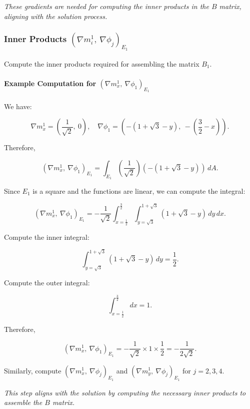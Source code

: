 \documentclass[class=article, crop=false]{standalone}
\begin{document}
\noindent
\textit{These gradients are needed for computing the inner products in the $B$ matrix, aligning with the solution process.}

\subsubsection{Inner Products $\left( \nabla m_i^1,\ \nabla \phi_j \right)_{E_1}$}

Compute the inner products required for assembling the matrix $B_1$.

\paragraph{Example Computation for $\left( \nabla m_x^1,\ \nabla \phi_1 \right)_{E_1}$}

We have:

\[
\nabla m_x^1 = \left( \dfrac{1}{\sqrt{2}},\ 0 \right), \quad \nabla \phi_1 = \left( - (1 + \sqrt{3} - y),\ - \left( \dfrac{3}{2} - x \right) \right).
\]

Therefore,

\[
\left( \nabla m_x^1,\ \nabla \phi_1 \right)_{E_1} = \int_{E_1} \left( \dfrac{1}{\sqrt{2}} \right) \left( - (1 + \sqrt{3} - y) \right) \, dA.
\]

Since $E_1$ is a square and the functions are linear, we can compute the integral:

\[
\left( \nabla m_x^1,\ \nabla \phi_1 \right)_{E_1} = - \dfrac{1}{\sqrt{2}} \int_{x = \tfrac{1}{2}}^{\tfrac{3}{2}} \int_{y = \sqrt{3}}^{1 + \sqrt{3}} (1 + \sqrt{3} - y) \, dy \, dx.
\]

Compute the inner integral:

\[
\int_{y = \sqrt{3}}^{1 + \sqrt{3}} (1 + \sqrt{3} - y) \, dy = \dfrac{1}{2}.
\]

Compute the outer integral:

\[
\int_{x = \tfrac{1}{2}}^{\tfrac{3}{2}} dx = 1.
\]

Therefore,

\[
\left( \nabla m_x^1,\ \nabla \phi_1 \right)_{E_1} = - \dfrac{1}{\sqrt{2}} \times 1 \times \dfrac{1}{2} = - \dfrac{1}{2\sqrt{2}}.
\]

Similarly, compute $\left( \nabla m_x^1,\ \nabla \phi_j \right)_{E_1}$ and $\left( \nabla m_y^1,\ \nabla \phi_j \right)_{E_1}$ for $j = 2, 3, 4$.

\noindent
\textit{This step aligns with the solution by computing the necessary inner products to assemble the $B$ matrix.}
\end{document}
